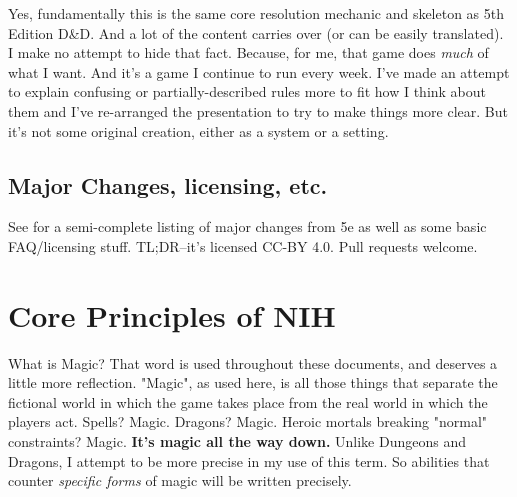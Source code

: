 Yes, fundamentally this is the same core resolution mechanic and skeleton as 5th Edition D\&D. And a lot of the content carries over (or can be easily translated). I make no attempt to hide that fact. Because, for me, that game does \textit{much} of what I want. And it's a game I continue to run every week. I've made an attempt to explain confusing or partially-described rules more to fit how I think about them and I've re-arranged the presentation to try to make things more clear. But it's not some original creation, either as a system or a setting.

\subsection{Major Changes, licensing, etc.}
See  for a semi-complete listing of major changes from 5e as well as some basic FAQ/licensing stuff. TL;DR--it's licensed CC-BY 4.0. Pull requests welcome.

\section{Core Principles of NIH}

\begin{DndSidebar}[float=b]{What is Magic?}
    That word is used throughout these documents, and deserves a little more reflection. "Magic", as used here, is all those things that separate the fictional world in which the game takes place from the real world in which the players act. Spells? Magic. Dragons? Magic. Heroic mortals breaking "normal" constraints? Magic. \textbf{It's magic all the way down.} Unlike Dungeons and Dragons, I attempt to be more precise in my use of this term. So abilities that counter \textit{specific forms} of magic will be written precisely.
\end{DndSidebar}

